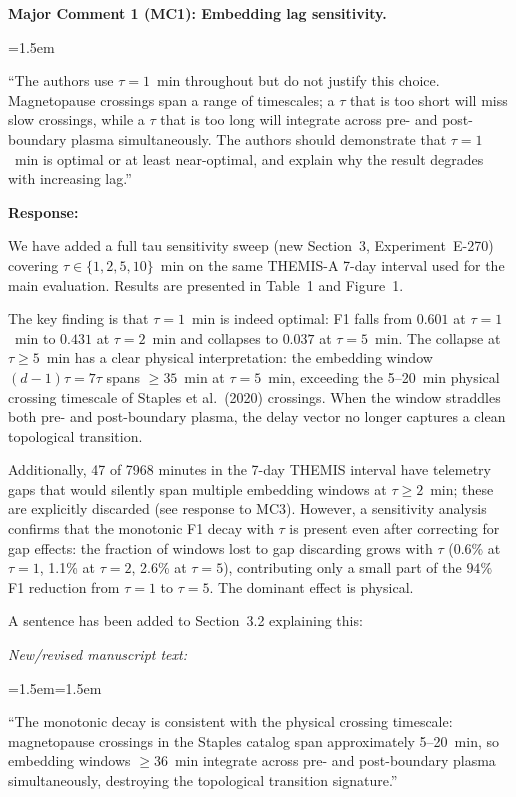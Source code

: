 \documentclass{article}
\newenvironment{reviewcomment}[1]{%
  \vspace{0.5em}
  \noindent\textbf{#1}\par\vspace{0.2em}
  \begin{list}{}{\leftmargin=1.5em}\item\itshape
}{%
  \end{list}\vspace{0.5em}
}
\newenvironment{authorresponse}{%
  \vspace{0.3em}
  \noindent\textbf{Response:}\hspace{0.5em}
}{%
  \vspace{0.5em}\par
}
\newenvironment{newtext}{%
  \vspace{0.3em}
  \noindent\textit{New/revised manuscript text:}\par\medskip
  \begin{list}{}{\leftmargin=1.5em\rightmargin=1.5em}
  \item\small
}{%
  \end{list}\vspace{0.3em}
}
\begin{document}
\begin{reviewcomment}{Major Comment 1 (MC1): Embedding lag sensitivity.}
``The authors use $\tau = 1$~min throughout but do not justify this choice.
Magnetopause crossings span a range of timescales; a $\tau$ that is too short
will miss slow crossings, while a $\tau$ that is too long will integrate
across pre- and post-boundary plasma simultaneously.  The authors should
demonstrate that $\tau = 1$~min is optimal or at least near-optimal, and
explain why the result degrades with increasing lag.''
\end{reviewcomment}

\begin{authorresponse}
We have added a full tau sensitivity sweep (new Section~3, Experiment~E-270)
covering $\tau \in \{1, 2, 5, 10\}$~min on the same THEMIS-A 7-day interval
used for the main evaluation.  Results are presented in Table~1 and Figure~1.

The key finding is that $\tau = 1$~min is indeed optimal: F1 falls from
$0.601$ at $\tau = 1$~min to $0.431$ at $\tau = 2$~min and collapses to
$0.037$ at $\tau = 5$~min.  The collapse at $\tau \geq 5$~min has a clear
physical interpretation: the embedding window $(d-1)\tau = 7\tau$ spans
$\geq 35$~min at $\tau = 5$~min, exceeding the 5--20~min physical crossing
timescale of Staples et al.\ (2020) crossings.  When the window straddles
both pre- and post-boundary plasma, the delay vector no longer captures a
clean topological transition.

Additionally, 47 of 7968 minutes in the 7-day THEMIS interval have telemetry
gaps that would silently span multiple embedding windows at $\tau \geq 2$~min;
these are explicitly discarded (see response to MC3).  However, a sensitivity
analysis confirms that the monotonic F1 decay with $\tau$ is present even
after correcting for gap effects: the fraction of windows lost to gap
discarding grows with $\tau$ (0.6\% at $\tau = 1$, 1.1\% at $\tau = 2$,
2.6\% at $\tau = 5$), contributing only a small part of the $94\%$ F1
reduction from $\tau = 1$ to $\tau = 5$.  The dominant effect is physical.

A sentence has been added to Section~3.2 explaining this:
\end{authorresponse}

\begin{newtext}
``The monotonic decay is consistent with the physical crossing timescale:
magnetopause crossings in the Staples catalog span approximately 5--20~min,
so embedding windows $\geq 36$~min integrate across pre- and post-boundary
plasma simultaneously, destroying the topological transition signature.''
\end{newtext}
\end{document}
